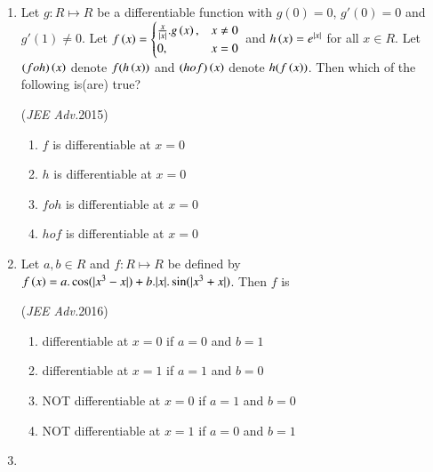 \documentclass[journal,12pt,twocolumn]{IEEEtran}
\theoremstyle{remark}
\begin{document}
\begin{enumerate}
    \item
\begin{flushleft}
   
    {Let $g: R\mapsto R$ be a differentiable function with $g(0)=0$, $g'(0)=0$ and $g'(1)\neq 0$. Let $f\left(x\right)=
        \begin{cases}
            \frac{x}{|x|}.g\left(x\right), & x\neq 0 \\
            0, & x=0
        \end{cases}$
        and $h\left(x\right)=e^{|x|}$ for all $x\in R$. Let $(foh)\left(x\right)$ denote $f(h\left(x\right))$ and $(hof)\left(x\right)$ denote $h(f\left(x\right))$. Then which of the following is(are) true?}
       
    \hfill
    {(\textit{JEE Adv.}2015)}
   
    \begin{enumerate}[label=(\alph*)]
       
        \item $f$ is differentiable at $x=0$
        \item $h$ is differentiable at $x=0$
        \item $foh$ is differentiable at $x=0$
        \item $hof$ is differentiable at $x=0$  
    \end{enumerate}
\end{flushleft}

    \item
\begin{flushleft}
   
    {Let $a, b\in R$ and $f: R\mapsto R$ be defined by $f\left(x\right)=a.\cos (|x^3-x|) +b.|x|.\sin (|x^3+x|)$. Then $f$ is}  
       
    \hfill
    {(\textit{JEE Adv.}2016)}
   
    \begin{enumerate}[label=(\alph*)]
       
        \item differentiable at $x=0$ if $a=0$ and $b=1$
        \item differentiable at $x=1$ if $a=1$ and $b=0$
        \item {NOT} differentiable at $x=0$ if $a=1$ and $b=0$
        \item {NOT} differentiable at $x=1$ if $a=0$ and $b=1$
    \end{enumerate}
\end{flushleft}

    \item
\begin{flushleft}
   

\end{flushleft}
\end{enumerate}
\end{document}

